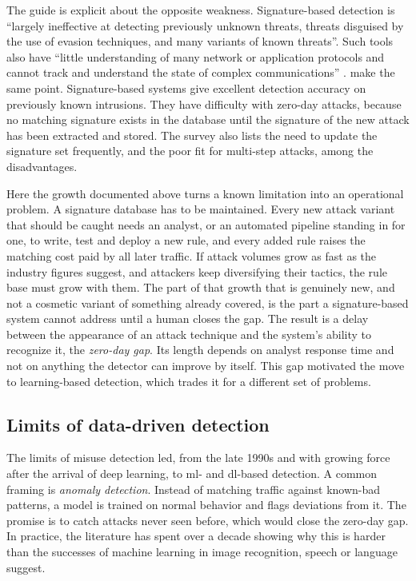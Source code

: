 The guide is explicit about the opposite weakness. Signature-based detection
is ``largely ineffective at detecting previously unknown threats, threats
disguised by the use of evasion techniques, and many variants of known
threats''. Such tools also have ``little understanding of many network or
application protocols and cannot track and understand the state of complex
communications'' \citep{scarfone2007nist80094}. \citet{khraisat2019survey}
make the same point. Signature-based systems give excellent detection
accuracy on previously known intrusions. They have difficulty with zero-day
attacks, because no matching signature exists in the database until the
signature of the new attack has been extracted and stored. The survey also
lists the need to update the signature set frequently, and the poor fit for
multi-step attacks, among the disadvantages.

Here the growth documented above turns a known limitation into an
operational problem. A signature database has to be maintained. Every new
attack variant that should be caught needs an analyst, or an automated
pipeline standing in for one, to write, test and deploy a new rule, and
every added rule raises the matching cost paid by all later traffic. If
attack volumes grow as fast as the industry figures suggest, and attackers
keep diversifying their tactics, the rule base must grow with them. The part
of that growth that is genuinely new, and not a cosmetic variant of
something already covered, is the part a signature-based system cannot
address until a human closes the gap. The result is a delay between the
appearance of an attack technique and the system's ability to recognize it,
the \emph{zero-day gap}. Its length depends on analyst response time and not
on anything the detector can improve by itself. This gap motivated the move
to learning-based detection, which trades it for a different set of
problems.

\subsection{Limits of data-driven detection}
\label{sec:datadriven-not-enough}

The limits of misuse detection led, from the late 1990s and with growing
force after the arrival of deep learning, to \gls{ml}- and \gls{dl}-based
detection. A common framing is \emph{anomaly detection}. Instead of matching
traffic against known-bad patterns, a model is trained on normal behavior and
flags deviations from it. The promise is to catch attacks never seen before, which would close the
zero-day gap. In practice, the literature has spent over a decade showing
why this is harder than the successes of machine learning in image
recognition, speech or language suggest.

